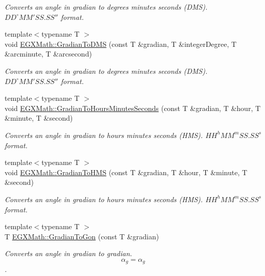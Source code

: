 \begin{DoxyCompactItemize}
\begin{DoxyCompactList}\small\item\em Converts an angle in gradian to degrees minutes seconds (D\+MS). ${DD}^{\circ}{MM}'{SS.SS}''$ format. \end{DoxyCompactList}\item 
{\footnotesize template$<$typename T $>$ }\\void \mbox{\hyperlink{group___e_g_x_math-_conversions-_angle_conversions-_gradian_ga0b6700b55ab4a24fa581bf2af0dafdaa}{E\+G\+X\+Math\+::\+Gradian\+To\+D\+MS}} (const T \&gradian, T \&integer\+Degree, T \&arcminute, T \&arcsecond)
\begin{DoxyCompactList}\small\item\em Converts an angle in gradian to degrees minutes seconds (D\+MS). ${DD}^{\circ}{MM}'{SS.SS}''$ format. \end{DoxyCompactList}\item 
{\footnotesize template$<$typename T $>$ }\\void \mbox{\hyperlink{group___e_g_x_math-_conversions-_angle_conversions-_gradian_gaf174cf5b716d5a490b3744ffe9ff3b97}{E\+G\+X\+Math\+::\+Gradian\+To\+Hours\+Minutes\+Seconds}} (const T \&gradian, T \&hour, T \&minute, T \&second)
\begin{DoxyCompactList}\small\item\em Converts an angle in gradian to hours minutes seconds (H\+MS). ${HH}^h{MM}^m{SS.SS}^s$ format. \end{DoxyCompactList}\item 
{\footnotesize template$<$typename T $>$ }\\void \mbox{\hyperlink{group___e_g_x_math-_conversions-_angle_conversions-_gradian_ga6513a992679fbb97d2969cf8bd68306f}{E\+G\+X\+Math\+::\+Gradian\+To\+H\+MS}} (const T \&gradian, T \&hour, T \&minute, T \&second)
\begin{DoxyCompactList}\small\item\em Converts an angle in gradian to hours minutes seconds (H\+MS). ${HH}^h{MM}^m{SS.SS}^s$ format. \end{DoxyCompactList}\item 
{\footnotesize template$<$typename T $>$ }\\T \mbox{\hyperlink{group___e_g_x_math-_conversions-_angle_conversions-_gradian_gaff399262b6c8455e450e0a9dc8eb2ad1}{E\+G\+X\+Math\+::\+Gradian\+To\+Gon}} (const T \&gradian)
\begin{DoxyCompactList}\small\item\em Converts an angle in gradian to gradian. \[\alpha_{g}=\alpha_{g}\]. \end{DoxyCompactList}\item 

\end{DoxyCompactItemize}
